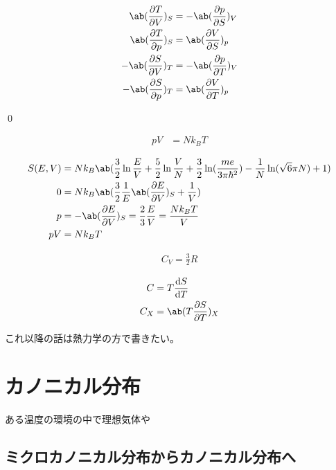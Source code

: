 \documentclass[uplatex,diffipdfmx,a4paper,11pt]{jlreq}
\makeatletter
\theoremstyle{definition}
\renewenvironment{proof}[1][\proofname]{\par
  \normalfont
  \topsep6\p@\@plus6\p@ \trivlist
  \item[\hskip\labelsep{\bfseries #1}\@addpunct{\bfseries}]\ignorespaces\quad\par
}{%
  \qed\endtrivlist\@endpefalse
}
\renewcommand\proofname{証明}
\makeatother
\begin{document}
\begin{proposition}
  \begin{align}
    \ab(\diffp{T}{V})_S  & = -\ab(\diffp{p}{S})_V \\
    \ab(\diffp{T}{p})_S  & = \ab(\diffp{V}{S})_p  \\
    -\ab(\diffp{S}{V})_T & = -\ab(\diffp{p}{T})_V \\
    -\ab(\diffp{S}{p})_T & = \ab(\diffp{V}{T})_p
  \end{align}
\end{proposition}
\begin{proof}

\end{proof}

\begin{theorem}[理想気体の状態方程式]
  \begin{align}
    pV & = Nk_BT
  \end{align}
\end{theorem}
\begin{align}
  S(E, V) & = Nk_B\ab(\frac{3}{2}\ln\frac{E}{V} + \frac{5}{2}\ln\frac{V}{N} + \frac{3}{2}\ln(\frac{me}{3\pi\hbar^2}) - \frac{1}{N}\ln(\sqrt{6}\pi N) + 1) \\
  0       & = Nk_B\ab(\frac{3}{2}\frac{1}{E}\ab(\diffp{E}{V})_S + \frac{1}{V})                                                                            \\
  p       & = -\ab(\diffp{E}{V})_S = \frac{2}{3}\frac{E}{V} = \frac{Nk_BT}{V}                                                                             \\
  pV      & = Nk_BT
\end{align}

\begin{align}
  C_V = \frac{3}{2}R
\end{align}

\begin{definition}[比熱]
  \begin{align}
    C   & = T\diff{S}{T}         \\
    C_X & = \ab(T\diffp{S}{T})_X
  \end{align}
\end{definition}
これ以降の話は熱力学の方で書きたい。

\section{カノニカル分布}
ある温度の環境の中で理想気体や
\subsection{ミクロカノニカル分布からカノニカル分布へ}
\end{document}
